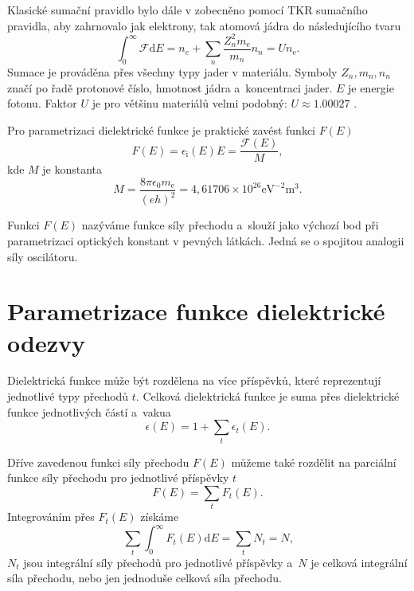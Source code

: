 Klasické sumační pravidlo bylo dále v \cite{sumrule} zobecněno pomocí TKR sumačního pravidla, aby zahrnovalo jak elektrony, tak atomová jádra do následujícího tvaru
\begin{equation}
\int_0^\infty \mathcal{F} \mathrm{d}E = n_e + \sum_n \frac{Z_n^2 m_\mathrm{e}} {m_n} n_n = U n_\mathrm{e} \mathrm{.}
\label{density}
\end{equation}
Sumace je prováděna přes všechny typy jader v materiálu. Symboly $Z_n, m_n, n_n$ značí po řadě protonové číslo, hmotnost jádra a~koncentraci jader. $E$ je energie fotonu. Faktor $U$ je pro většinu materiálů velmi podobný: $U \approx 1.00027$ \cite{sumrule}.

Pro parametrizaci dielektrické funkce je praktické zavést funkci $F(E)$
\begin{equation}
F(E) = \epsilon_\mathrm{i}(E) E = \frac{\mathcal{F}(E)}{M}\mathrm{,}
\end{equation}  
kde $M$ je konstanta
\begin{equation} 
M = \frac{8 \pi \epsilon_0 m_\mathrm{e}}{(e h)^2} = 4,61706\times10^{26} \mathrm{eV}^{-2}\mathrm{m}^3 \mathrm{.}
\end{equation}

Funkci $F(E)$ nazýváme funkce síly přechodu a~slouží jako výchozí bod při parametrizaci optických konstant v pevných látkách. Jedná se o spojitou analogii síly oscilátoru.

\section{Parametrizace funkce dielektrické odezvy}
Dielektrická funkce může být rozdělena na více příspěvků, které reprezentují jednotlivé typy přechodů $t$. Celková dielektrická funkce je suma přes dielektrické funkce jednotlivých částí a~vakua \cite{sumrule}
\begin{equation}
\epsilon(E) = 1 + \sum_t \epsilon_t(E) \text{.}
\label{suma1}
\end{equation}

Dříve zavedenou funkci síly přechodu $F(E)$ můžeme také rozdělit na parciální funkce síly přechodu pro jednotlivé příspěvky $t$
\begin{equation}
F(E) = \sum_t F_t(E) \text{.}
\end{equation}
Integrováním přes $F_t(E)$ získáme 
\begin{equation}
\label{definiceceelkovesily}
\sum_t \int_0^\infty F_t(E)\mathrm{d}E = \sum_t N_t = N \text{,}
\end{equation}
$N_t$ jsou integrální síly přechodů pro jednotlivé příspěvky a~$N$ je celková integrální síla přechodu, nebo jen jednoduše celková síla přechodu.  

